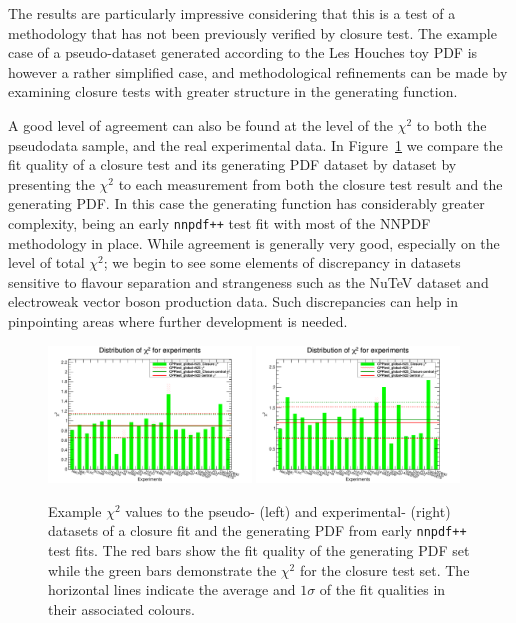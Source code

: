The results are particularly impressive considering that this is a test of a methodology that has not been previously verified by closure test. The example case of a pseudo-dataset generated according to the Les Houches toy PDF is however a rather simplified case, and methodological refinements can be made by examining closure tests with greater structure in the generating function.

A good level of agreement can also be found at the level of the $\chi^2$ to both the pseudodata sample, and the real experimental data. In Figure~\ref{fig:CPPclosurechi2} we compare the fit quality of a closure test and its generating PDF dataset by dataset by presenting the $\chi^2$ to each measurement from both the closure test result and the generating PDF. In this case the generating function has considerably greater complexity, being an early {\tt nnpdf++} test fit with most of the NNPDF methodology in place. While agreement is generally very good, especially on the level of total $\chi^2$; we begin to see some elements of discrepancy in datasets sensitive to flavour separation and strangeness such as the NuTeV dataset and electroweak vector boson production data. Such discrepancies can help in pinpointing areas where further development is needed.


\begin{figure}[!]
\centering
\includegraphics[width=0.48\textwidth]{7-PostLHC/figs/chi2_histo_nnpdf1.pdf}
\includegraphics[width=0.48\textwidth]{7-PostLHC/figs/chi2_histo_nnpdf2.pdf}
\caption[$\chi^2$ values to the pseudo- and experimental-datasets of a closure fit and the generating PDF]{Example $\chi^2$ values to the pseudo- (left) and experimental- (right) datasets of a closure fit and the generating PDF from early {\tt nnpdf++} test fits. The red bars show the fit quality of the generating PDF set while the green bars demonstrate the $\chi^2$ for the closure test set. The horizontal lines indicate the average and $1\sigma$ of the fit qualities in their associated colours.}
\label{fig:CPPclosurechi2}
\end{figure}


